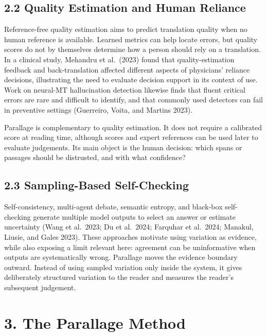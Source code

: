 \documentclass[
  12pt,
]{article}
\begin{document}
\subsection{2.2 Quality Estimation and Human
Reliance}\label{quality-estimation-and-human-reliance}

Reference-free quality estimation aims to predict translation quality
when no human reference is available. Learned metrics can help locate
errors, but quality scores do not by themselves determine how a person
should rely on a translation. In a clinical study, Mehandru et
al.~(2023) found that quality-estimation feedback and back-translation
affected different aspects of physicians' reliance decisions,
illustrating the need to evaluate decision support in its context of
use. Work on neural-MT hallucination detection likewise finds that
fluent critical errors are rare and difficult to identify, and that
commonly used detectors can fail in preventive settings (Guerreiro,
Voita, and Martins 2023).

Parallage is complementary to quality estimation. It does not require a
calibrated score at reading time, although scores and expert references
can be used later to evaluate judgements. Its main object is the human
decision: which spans or passages should be distrusted, and with what
confidence?

\subsection{2.3 Sampling-Based
Self-Checking}\label{sampling-based-self-checking}

Self-consistency, multi-agent debate, semantic entropy, and black-box
self-checking generate multiple model outputs to select an answer or
estimate uncertainty (Wang et al.~2023; Du et al.~2024; Farquhar et
al.~2024; Manakul, Liusie, and Gales 2023). These approaches motivate
using variation as evidence, while also exposing a limit relevant here:
agreement can be uninformative when outputs are systematically wrong.
Parallage moves the evidence boundary outward. Instead of using sampled
variation only inside the system, it gives deliberately structured
variation to the reader and measures the reader's subsequent judgement.

\section{3. The Parallage Method}\label{the-parallage-method}
\end{document}
